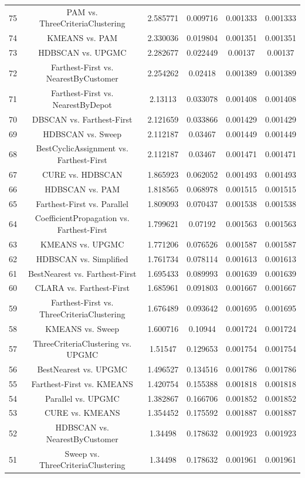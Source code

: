 \documentclass[a4paper,10pt]{article}
\begin{document}
\begin{landscape}
\begin{table}[!htp]
\begin{tabular}{cccccc}
75&PAM vs. ThreeCriteriaClustering&2.585771&0.009716&0.001333&0.001333\\
74&KMEANS vs. PAM&2.330036&0.019804&0.001351&0.001351\\
73&HDBSCAN vs. UPGMC&2.282677&0.022449&0.00137&0.00137\\
72&Farthest-First vs. NearestByCustomer&2.254262&0.02418&0.001389&0.001389\\
71&Farthest-First vs. NearestByDepot&2.13113&0.033078&0.001408&0.001408\\
70&DBSCAN vs. Farthest-First&2.121659&0.033866&0.001429&0.001429\\
69&HDBSCAN vs. Sweep&2.112187&0.03467&0.001449&0.001449\\
68&BestCyclicAssignment vs. Farthest-First&2.112187&0.03467&0.001471&0.001471\\
67&CURE vs. HDBSCAN&1.865923&0.062052&0.001493&0.001493\\
66&HDBSCAN vs. PAM&1.818565&0.068978&0.001515&0.001515\\
65&Farthest-First vs. Parallel&1.809093&0.070437&0.001538&0.001538\\
64&CoefficientPropagation vs. Farthest-First&1.799621&0.07192&0.001563&0.001563\\
63&KMEANS vs. UPGMC&1.771206&0.076526&0.001587&0.001587\\
62&HDBSCAN vs. Simplified&1.761734&0.078114&0.001613&0.001613\\
61&BestNearest vs. Farthest-First&1.695433&0.089993&0.001639&0.001639\\
60&CLARA vs. Farthest-First&1.685961&0.091803&0.001667&0.001667\\
59&Farthest-First vs. ThreeCriteriaClustering&1.676489&0.093642&0.001695&0.001695\\
58&KMEANS vs. Sweep&1.600716&0.10944&0.001724&0.001724\\
57&ThreeCriteriaClustering vs. UPGMC&1.51547&0.129653&0.001754&0.001754\\
56&BestNearest vs. UPGMC&1.496527&0.134516&0.001786&0.001786\\
55&Farthest-First vs. KMEANS&1.420754&0.155388&0.001818&0.001818\\
54&Parallel vs. UPGMC&1.382867&0.166706&0.001852&0.001852\\
53&CURE vs. KMEANS&1.354452&0.175592&0.001887&0.001887\\
52&HDBSCAN vs. NearestByCustomer&1.34498&0.178632&0.001923&0.001923\\
51&Sweep vs. ThreeCriteriaClustering&1.34498&0.178632&0.001961&0.001961\\

\end{tabular}
\end{table}
\end{landscape}
\end{document}
